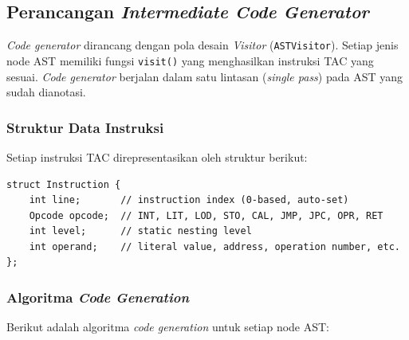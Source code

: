 \documentclass[12pt,a4paper]{article}
\begin{document}
\subsection{Perancangan \textit{Intermediate Code Generator}}

\textit{Code generator} dirancang dengan pola desain \textit{Visitor}
(\texttt{ASTVisitor}). Setiap jenis node AST memiliki fungsi \texttt{visit()}
yang menghasilkan instruksi TAC yang sesuai. \textit{Code generator} berjalan
dalam satu lintasan (\textit{single pass}) pada AST yang sudah dianotasi.

\subsubsection{Struktur Data Instruksi}

Setiap instruksi TAC direpresentasikan oleh struktur berikut:

\begin{lstlisting}[style=cpp, caption={Struktur Instruction}]
struct Instruction {
    int line;       // instruction index (0-based, auto-set)
    Opcode opcode;  // INT, LIT, LOD, STO, CAL, JMP, JPC, OPR, RET
    int level;      // static nesting level
    int operand;    // literal value, address, operation number, etc.
};
\end{lstlisting}

\subsubsection{Algoritma \textit{Code Generation}}

Berikut adalah algoritma \textit{code generation} untuk setiap node AST:
\end{document}
